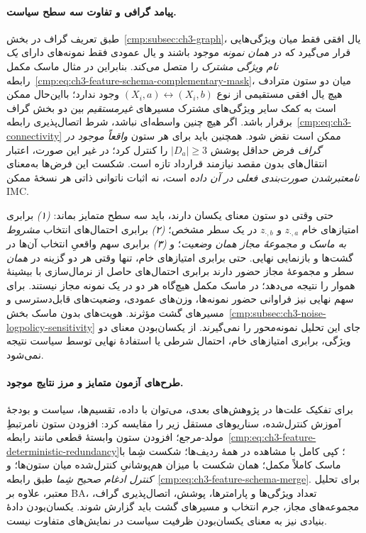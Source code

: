 \paragraph{پیامد گرافی و تفاوت سه سطح سیاست.}
طبق تعریف گراف در
بخش~\ref{cmp:subsec:ch3-graph}،
یال افقی فقط میان ویژگی‌هایی
قرار می‌گیرد که در \emph{همان
نمونه} موجود باشند و یال عمودی
فقط نمونه‌های دارای \emph{یک
نام ویژگی مشترک} را متصل می‌کند.
بنابراین در مثال ماسک مکمل
رابطه~\eqref{cmp:eq:ch3-feature-schema-complementary-mask}،
میان دو ستون مترادف هیچ یال افقی
مستقیمی از نوع
$(X_i,a)\leftrightarrow(X_i,b)$
وجود ندارد؛ بااین‌حال ممکن است
به کمک سایر ویژگی‌های مشترک
مسیرهای \emph{غیرمستقیم} بین
دو بخش گراف برقرار باشد.
اگر هیچ چنین واسطه‌ای نباشد،
شرط اتصال‌پذیری
رابطه~\eqref{cmp:eq:ch3-connectivity}
ممکن است نقض شود. همچنین باید
برای هر ستون \emph{واقعاً موجود
در گراف} فرض حداقل پوشش
$|D_a|\ge3$ را کنترل کرد؛
در غیر این صورت، اعتبار انتقال‌های
بدون مقصد نیازمند قرارداد تازه است.
شکست این فرض‌ها به‌معنای
\emph{نامعتبرشدن صورت‌بندی فعلی
در آن داده} است، نه اثبات
ناتوانی ذاتی هر نسخهٔ ممکن IMC.

حتی وقتی دو ستون معنای یکسان دارند،
باید سه سطح متمایز بماند:
\emph{(۱)} برابری امتیازهای خام
$z_{\cdot,a}$ و $z_{\cdot,b}$
در یک سطر مشخص؛
\emph{(۲)} برابری احتمال‌های
انتخاب \emph{مشروط به ماسک و
مجموعهٔ مجاز همان وضعیت}؛
و \emph{(۳)} برابری سهم واقعیِ
انتخاب آن‌ها در گشت‌ها و
بازنمایی نهایی. حتی برابری
امتیازهای خام، تنها وقتی هر دو گزینه
در \emph{همان} سطر و
مجموعهٔ مجاز حضور دارند
برابری احتمال‌های حاصل از نرمال‌سازی با بیشینهٔ هموار را
نتیجه می‌دهد؛ در ماسک مکمل
هیچ‌گاه هر دو در یک نمونه
مجاز نیستند. برای سهم نهایی
نیز فراوانی حضور نمونه‌ها،
وزن‌های عمودی، وضعیت‌های
قابل‌دسترسی و مسیرهای گشت
مؤثرند. هویت‌های بدون ماسک
بخش~\ref{cmp:subsec:ch3-noise-logpolicy-sensitivity}
جای این تحلیل نمونه‌محور را
نمی‌گیرند. از یکسان‌بودن
معنای دو ویژگی، برابری امتیازهای خام،
احتمال شرطی یا استفادهٔ نهایی
توسط سیاست نتیجه نمی‌شود.

\paragraph{طرح‌های آزمون متمایز و مرز نتایج موجود.}
برای تفکیک علت‌ها در پژوهش‌های
بعدی، می‌توان با داده، تقسیم‌ها،
سیاست و بودجهٔ آموزش کنترل‌شده،
سناریوهای مستقل زیر را مقایسه کرد:
افزودن ستون نامرتبطِ مولد-مرجع؛
افزودن ستون وابستهٔ قطعی مانند
رابطه~\eqref{cmp:eq:ch3-feature-deterministic-redundancy}؛
کپی کامل با مشاهده در همهٔ ردیف‌ها؛
شکست شِما با ماسک کاملاً مکمل؛
همان شکست با میزان هم‌پوشانیِ
کنترل‌شده میان ستون‌ها؛ و
\emph{کنترل ادغام صحیح شِما}
طبق رابطه~\eqref{cmp:eq:ch3-feature-schema-merge}.
برای تحلیل معتبر، علاوه بر BA،
تعداد ویژگی‌ها و پارامترها،
پوشش، اتصال‌پذیری گراف،
مجموعه‌های مجاز، جرم انتخاب
و مسیرهای گشت باید گزارش شوند.
یکسان‌بودن دادهٔ بنیادی نیز
به معنای یکسان‌بودن ظرفیت
سیاست در نمایش‌های متفاوت نیست.

